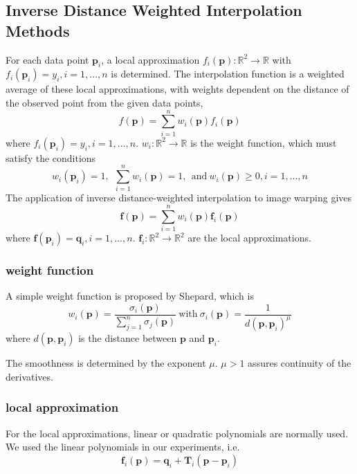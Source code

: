 \documentclass{article}
\begin{document}
\subsection{Inverse Distance Weighted Interpolation Methods}
For each data point $\mathbf{p}_i$, a local approximation $f_i(\mathbf{p}):\mathbb{R}^2\rightarrow\mathbb{R}$ with $f_i(\mathbf{p}_i)=y_i, i=1,...,n$ is determined. The interpolation function is a weighted average of these local approximations, with weights dependent on the distance of the observed point from the given data points,
\begin{equation}
    f(\mathbf{p})=\sum_{i=1}^nw_i(\mathbf{p})f_i(\mathbf{p})
\end{equation}
where $f_i(\mathbf{p}_i)=y_i,i=1,...,n.$  $w_i:\mathbb{R}^2\rightarrow\mathbb{R}$ is the weight function, which must satisfy the conditions
\begin{equation}
    w_i(\mathbf{p}_i)=1,\ \ \sum_{i=1}^nw_i(\mathbf{p})=1,\ \ \mathrm{and}\ w_i(\mathbf{p})\ge0, i=1,...,n
\end{equation}
The application of inverse distance-weighted interpolation to image warping gives
\begin{equation}
    \mathbf{f}(\mathbf{p})=\sum_{i=1}^nw_i(\mathbf{p})\mathbf{f}_i(\mathbf{p})
\end{equation}
where $\mathbf{f}(\mathbf{p}_i)=\mathbf{q}_i,i=1,...,n$. $\mathbf{f}_i:\mathbb{R}^2\rightarrow\mathbb{R}^2$ are the local approximations.


\subsubsection*{weight function}
A simple weight function is proposed by Shepard, which is
\begin{equation}
    \displaystyle w_i(\mathbf{p})=\frac{\sigma_i(\mathbf{p})}{\sum\limits_{j=1}^n\sigma_j(\mathbf{p})}\ \mathrm{with}\ \sigma_i(\mathbf{p})=\frac{1}{d(\mathbf{p},\mathbf{p}_i)^\mu}\label{con:inventoryflow}
\end{equation}
where $d(\mathbf{p},\mathbf{p}_i)$ is the distance between $\mathbf{p}$ and $\mathbf{p}_i$.

The smoothness is determined by the exponent $\mu$. $\mu>1$ assures continuity of the derivatives.
\subsubsection*{local approximation}
For the local approximations, linear or quadratic polynomials are normally used. We used the linear polynomials in our experiments, i.e.
\begin{equation}
    \mathbf{f}_i(\mathbf{p})=\mathbf{q}_i+\mathbf{T}_i(\mathbf{p}-\mathbf{p}_i)
\end{equation}
\end{document}
